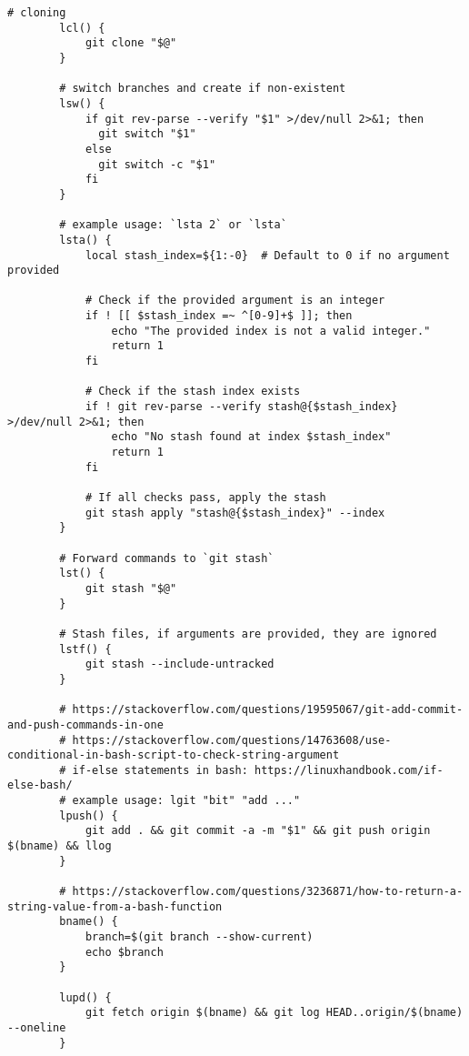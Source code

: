 \documentclass[12pt, a4paper]{article}
\numberwithin{equation}{section}
\theoremstyle{definition}
\theoremstyle{definition}
\begin{document}
\begin{lstlisting}[style=mystylebash, label=alg:bashrc_contents, caption=Contents of .bashrc file, xleftmargin=\parindent]
		# cloning
		lcl() {
			git clone "$@"
		}

		# switch branches and create if non-existent
		lsw() {                                                                                                           
			if git rev-parse --verify "$1" >/dev/null 2>&1; then                                                            
			  git switch "$1"                                                                                               
			else                                                                                                            
			  git switch -c "$1"                                                                                            
			fi                                                                                                              
		}

		# example usage: `lsta 2` or `lsta` 
		lsta() {
			local stash_index=${1:-0}  # Default to 0 if no argument provided
			
			# Check if the provided argument is an integer
			if ! [[ $stash_index =~ ^[0-9]+$ ]]; then
				echo "The provided index is not a valid integer."
				return 1
			fi
			
			# Check if the stash index exists
			if ! git rev-parse --verify stash@{$stash_index} >/dev/null 2>&1; then
				echo "No stash found at index $stash_index"
				return 1  
			fi
			
			# If all checks pass, apply the stash
			git stash apply "stash@{$stash_index}" --index
		}
		
		# Forward commands to `git stash`
		lst() {
			git stash "$@"
		}
		
		# Stash files, if arguments are provided, they are ignored
		lstf() {
			git stash --include-untracked
		}

		# https://stackoverflow.com/questions/19595067/git-add-commit-and-push-commands-in-one
		# https://stackoverflow.com/questions/14763608/use-conditional-in-bash-script-to-check-string-argument
		# if-else statements in bash: https://linuxhandbook.com/if-else-bash/
		# example usage: lgit "bit" "add ..."
		lpush() {
			git add . && git commit -a -m "$1" && git push origin $(bname) && llog
		}
	
		# https://stackoverflow.com/questions/3236871/how-to-return-a-string-value-from-a-bash-function
		bname() {
			branch=$(git branch --show-current)
			echo $branch    
		}
		
		lupd() {
			git fetch origin $(bname) && git log HEAD..origin/$(bname) --oneline
		}
		

\end{lstlisting}
\end{document}
